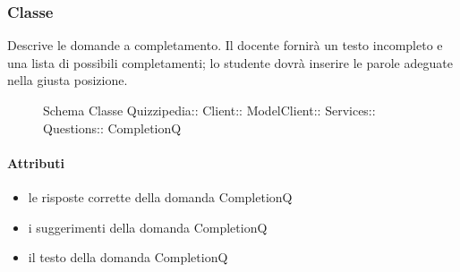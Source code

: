 \subsubsection{Classe }
Descrive le domande a completamento. Il docente fornirà un testo incompleto e una lista di possibili completamenti; lo studente dovrà inserire le parole adeguate nella giusta posizione.
\begin{figure}[H]
\centering
\noindent{}
\caption[Schema Classe CompletionQ]{Schema Classe Quizzipedia:: Client:: ModelClient:: Services:: Questions:: CompletionQ}
\end{figure}
\paragraph{Attributi}
\begin{itemize}
\item {}
\newline
le risposte corrette della domanda CompletionQ
\item {}
\newline
i suggerimenti della domanda CompletionQ
\item {}
\newline
il testo della domanda CompletionQ
\end{itemize}
